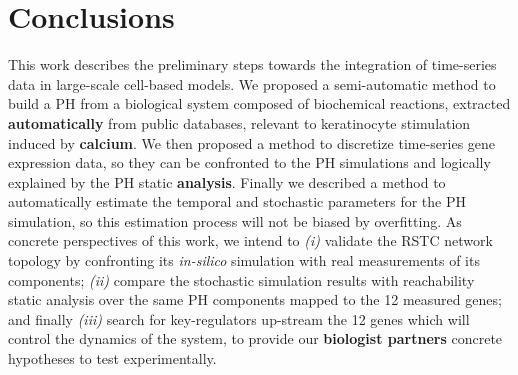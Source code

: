 \documentclass[11pt,a4paper,twoside]{epig}
\begin{document}
\section{Conclusions}
This work describes the preliminary steps towards the integration of time-series data in large-scale cell-based models. 
We proposed a semi-automatic method to build a PH from a biological system composed of biochemical reactions, extracted \textbf{automatically} from public databases, 
relevant to keratinocyte stimulation induced by \textbf{calcium}. 
We then proposed a method to discretize time-series gene expression data, so they can be confronted to the PH simulations and logically explained by the PH static \textbf{analysis}. 
Finally we described a method to automatically estimate the temporal and stochastic
parameters for the PH simulation, so this estimation process will not be biased by overfitting.
As concrete perspectives of this work, we intend to \emph{(i)} validate the RSTC network topology by confronting its \emph{in-silico} simulation with real measurements of its components;
\emph{(ii)} compare the stochastic simulation results with reachability static analysis over the same PH components mapped to the 12 measured genes; and 
finally \emph{(iii)} search for key-regulators up-stream the 12 genes which will control the dynamics of the system, to  provide our \textbf{biologist  partners} concrete 
hypotheses to test experimentally.


%
%
\end{document}
